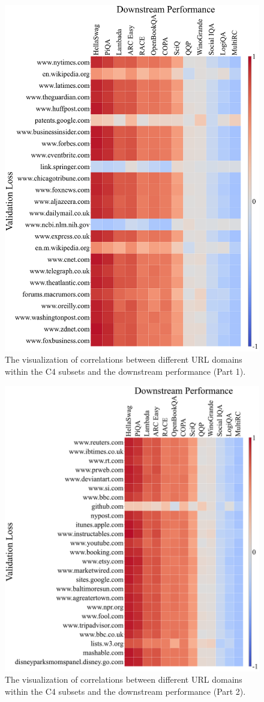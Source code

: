 \begin{figure}[htbp]
    \centering
    \includegraphics[height=0.9\textwidth]{figures/Domain_and_Task_c4100_full_1.pdf}
    \caption{The visualization of correlations between different URL domains within the C4 subsets and the downstream performance (Part 1).}
    \label{fig:c4100-full-1}
\end{figure}

\begin{figure}[htbp]
    \centering
    \includegraphics[height=0.9\textwidth]{figures/Domain_and_Task_c4100_full_2.pdf}
    \caption{The visualization of correlations between different URL domains within the C4 subsets and the downstream performance (Part 2).}
    \label{fig:c4100-full-2}
\end{figure}

